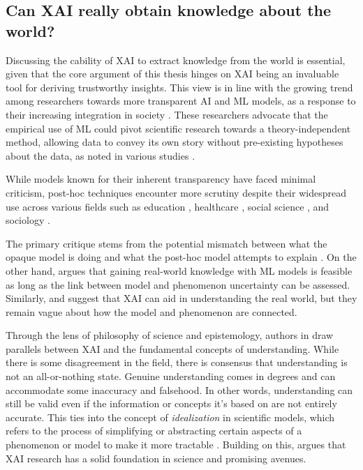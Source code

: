\subsection{Can XAI really obtain knowledge about the world?}
\label{xai_can_fail_but_is_usable}

Discussing the cability of \gls{XAI} to extract knowledge from the world is essential, given that the core argument of this thesis hinges on \gls{XAI} being an invaluable tool for deriving trustworthy insights. This view is in line with the growing trend among researchers towards more transparent \gls{AI} and \gls{ML} models, as a response to their increasing integration in society \cite{Arya2019OneTechniques}. These researchers advocate that the empirical use of \gls{ML} could pivot scientific research towards a theory-independent method, allowing data to convey its own story without pre-existing hypotheses about the data, as noted in various studies \cite{Kitchin2014BigShifts, Anderson2008TheObsolete, Naimi2014BigThink, Andrews2023TheIdeal, LiebersonImplicationSciences}.

While models known for their inherent transparency have faced minimal criticism, post-hoc techniques encounter more scrutiny  despite their widespread use across various fields such as education \cite{Lezhnina2022CombiningPISA, Martinez-Abad2020EducationalAssessment}, healthcare \cite{Jauhiainen2021NewAthletes, Stiglic2020InterpretabilityHealthcare}, social science \cite{Berger2023ExplainableChains, Bellantuono2023DetectingIntelligence}, and sociology \cite{Li2023ApplyingPandemic, Fan2023InterpretableInequality}.


The primary critique stems from the potential mismatch between what the opaque model is doing and what the post-hoc model attempts to explain \cite{Rudin2019StopInstead, Mullainathan2017MachineApproach, Babic2021BewareCare}. On the other hand, \cite{Sullivan2022UnderstandingModels} argues that gaining real-world knowledge with ML models is feasible as long as the link between model and phenomenon uncertainty can be assessed. Similarly, \cite{Cichy2019DeepModels} and \cite{Zednik2021SolvingIntelligence} suggest that \gls{XAI} can aid in understanding the real world, but they remain vague about how the model and phenomenon are connected.

Through the lens of philosophy of science and epistemology, authors in \cite{Fleisher2022UnderstandingAI} draw parallels between \gls{XAI} and the fundamental concepts of understanding. While there is some disagreement in the field, there is consensus that understanding is not an all-or-nothing state. Genuine understanding comes in degrees and can accommodate some inaccuracy and falsehood. In other words, understanding can still be valid even if the information or concepts it's based on are not entirely accurate. This ties into the concept of \textit{idealization} in scientific models, which refers to the process of simplifying or abstracting certain aspects of a phenomenon or model to make it more tractable \cite{Jebeile2015ExplainingIdealizations}. Building on this, \cite{Fleisher2022UnderstandingAI} argues that \gls{XAI} research has a solid foundation in science and promising avenues.

